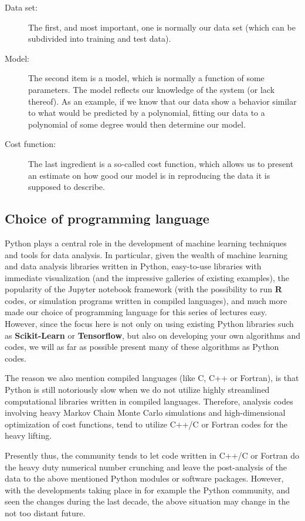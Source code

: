 \documentclass[%
oneside,                 %
final,                   %
10pt]{article}
\begin{document}
\begin{description}
\item[Data set:] 
  The first, and most important, one is normally our data set (which can be subdivided into training and test data). 

\item[Model:] 
  The second item is a model, which is normally a function of some parameters. The model reflects our knowledge of the system (or lack thereof). As an example, if we know that our data show a behavior similar to what would be predicted by a polynomial, fitting our data to a polynomial of some degree would then determine our model. 

\item[Cost function:] 
  The last ingredient is a so-called cost function, which allows us to present an estimate on how good our model is in reproducing the data it is supposed to describe.  
\end{description}

\noindent
\subsection{Choice of programming language}

Python plays a central role in the development of machine
learning techniques and tools for data analysis. In particular, given
the wealth of machine learning and data analysis libraries written in
Python, easy-to-use libraries with immediate visualization (and the
impressive galleries of existing examples), the popularity of the
Jupyter notebook framework (with the possibility to run \textbf{R} codes, or
simulation programs written in compiled languages), and much more made our choice of
programming language for this series of lectures easy. However,
since the focus here is not only on using existing Python libraries such
as \textbf{Scikit-Learn} or \textbf{Tensorflow}, but also on developing your own
algorithms and codes, we will as far as possible present many of these
algorithms as Python codes. 

The reason we also  mention compiled languages (like C, C++ or
Fortran), is that Python is still notoriously slow when we do not
utilize highly streamlined computational libraries 
written in compiled languages.  Therefore, analysis codes involving heavy Markov Chain Monte Carlo simulations and high-dimensional optimization of cost functions, tend to utilize C++/C or Fortran codes for the heavy lifting.

Presently thus, the community tends to let
code written in C++/C or Fortran do the heavy duty numerical
number crunching and leave the post-analysis of the data to the above
mentioned Python modules or software packages.  However, with the developments taking place in for example the Python community, and seen
the changes during the last decade, the above situation may change in the not too distant future. 
\end{document}
